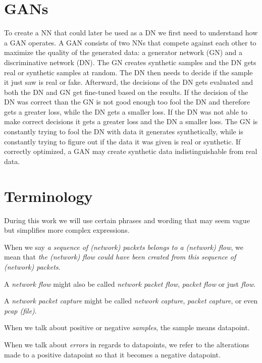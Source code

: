 \documentclass[
	ngerman,
	ruledheaders=section,%
	class=report,%
	thesis={type=bachelor},%
	accentcolor=9c,%
	custommargins=true,%
	marginpar=false,%
	parskip=half-,%
	fontsize=11pt,%
]{tudapub}
\begin{document}
\section{GANs}
\label{sec:GAN}

To create a NN that could later be used as a DN we first need to understand how a GAN operates.
A GAN consists of two NNs that compete against each other to maximize the quality of the generated data:
a generator network (GN) and a discriminative network (DN).
The GN creates synthetic samples and the DN gets real or synthetic samples at random.
The DN then needs to decide if the sample it just saw is real or fake.
Afterward, the decisions of the DN gets evaluated and both the DN and GN get fine-tuned based on the results.
If the decision of the DN was correct than the GN is not good enough too fool the DN and therefore gets a greater loss, while the DN gets a smaller loss.
If the DN was not able to make correct decisions it gets a greater loss and the DN a smaller loss.
The GN is constantly trying to fool the DN with data it generates synthetically,
while is constantly trying to figure out if the data it was given is real or synthetic.
If correctly optimized, a GAN may create synthetic data indistinguishable from real data.

\pagebreak

\section{Terminology}
\label{sec:terminology}

During this work we will use certain phrases and wording that may seem vague but simplifies more complex expressions.

When we say \textit{a sequence of (network) packets belongs to a (network) flow}, we mean that \textit{the (network) flow could have been created from this sequence of (network) packets}.

A \textit{network flow} might also be called \textit{network packet flow}, \textit{packet flow} or just \textit{flow}.

A \textit{network packet capture} might be called \textit{network capture}, \textit{packet capture}, or even \textit{pcap (file)}.


When we talk about positive or negative \textit{samples}, the sample means datapoint.

When we talk about \textit{errors} in regards to datapoints, we refer to the alterations made to a positive datapoint so that it becomes a negative datapoint.
\end{document}
